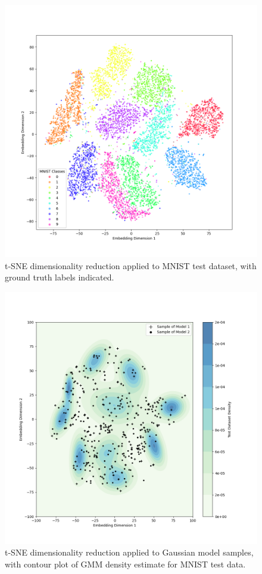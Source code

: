 \documentclass[12pt]{article}
\begin{document}
\begin{figure}[hp]
    \includegraphics[scale=0.54, center]{figures/tsne_mnist.png}
    \caption{t-SNE dimensionality reduction applied to MNIST test dataset, with ground truth labels indicated.}
    \label{fig:tsne_mnist}
\end{figure}

\begin{figure}[hp]
    \includegraphics[scale=0.54, center]{figures/tsne_gaussian_models.png}
    \caption{t-SNE dimensionality reduction applied to Gaussian model samples, with contour plot of GMM density estimate for MNIST test data.}
    \label{fig:tsne_gaussian}
\end{figure}
\end{document}
